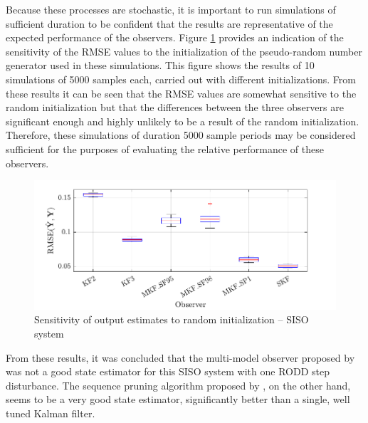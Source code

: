 Because these processes are stochastic, it is important to run simulations of sufficient duration to be confident that the results are representative of the expected performance of the observers. Figure \ref{fig:rod-obs-sim1-yest-all-seed-RMSE-box} provides an indication of the sensitivity of the RMSE values to the initialization of the pseudo-random number generator used in these simulations. This figure shows the results of 10 simulations of 5000 samples each, carried out with different initializations. From these results it can be seen that the RMSE values are somewhat sensitive to the random initialization but that the differences between the three observers are significant enough and highly unlikely to be a result of the random initialization. Therefore, these simulations of duration 5000 sample periods may be considered sufficient for the purposes of evaluating the relative performance of these observers.
\begin{figure}[htp]
	\centering
	\includegraphics[width=12cm]{images/rod_obs_sim1_all_seed_y_err_box.pdf}
	\caption{Sensitivity of output estimates to random initialization – SISO system}
	\label{fig:rod-obs-sim1-yest-all-seed-RMSE-box}
\end{figure}

From these results, it was concluded that the multi-model observer proposed by \cite{robertson_method_1998} was not a good state estimator for this SISO system with one RODD step disturbance. The sequence pruning algorithm proposed by \cite{eriksson_classification_1996}, on the other hand, seems to be a very good state estimator, significantly better than a single, well tuned Kalman filter.

%
%
%

